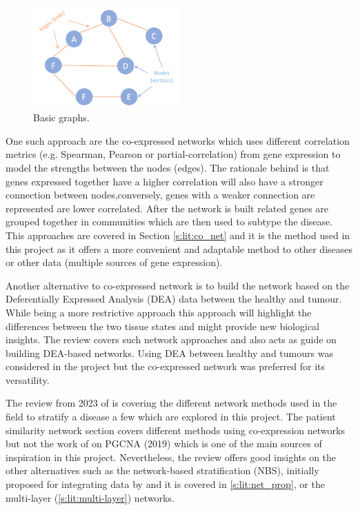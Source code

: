 \begin{figure}[!htb]
  \centering\includegraphics[width=0.5\textwidth,height=0.5\textheight,keepaspectratio]{Sections/Lit_review/Resources/basic_graphs.png}
    \caption{Basic graphs.}
    \label{fig:lit:basic_net}
\end{figure}
\FloatBarrier



One such approach are the co-expressed networks which uses different correlation metrics (e.g. Spearman, Pearson or partial-correlation) from gene expression to model the strengths between the nodes (edges). The rationale behind is that genes expressed together have a higher correlation will also have a stronger connection between nodes,conversely, genes with a weaker connection are represented are lower correlated. After the network is built related genes are grouped together in communities which are then used to subtype the disease. This approaches are covered in Section \ref{s:lit:co_net} and it is the method used in this project as it offers a more convenient and adaptable method to other diseases or other data (multiple sources of gene expression).

Another alternative to co-expressed network is to build the network based on the Deferentially Expressed Analysis (DEA) data between the healthy and tumour. While being a more restrictive approach this approach will highlight the differences between the two tissue states and might provide new biological insights. The review \citet{Van_Dam2018-id} covers such network approaches and also acts as guide on building DEA-based networks. Using DEA between healthy and tumours was considered in the project but the co-expressed network was preferred for its versatility.

The review from 2023 of \citet{Petti2023-qo} is covering the different network methods used in the field to stratify a disease a few which are explored in this project. The patient similarity network section covers different methods using co-expression networks but not the work of \citet{Care2019-ij} on PGCNA (2019) which is one of the main sources of inspiration in this project. Nevertheless, the review offers good insights on the other alternatives such as the network-based stratification (NBS), initially proposed for integrating data by \citet{Hofree2013-ld} and it is covered in \cref{s:lit:net_prop}, or the multi-layer (\cref{s:lit:multi-layer}) networks.

